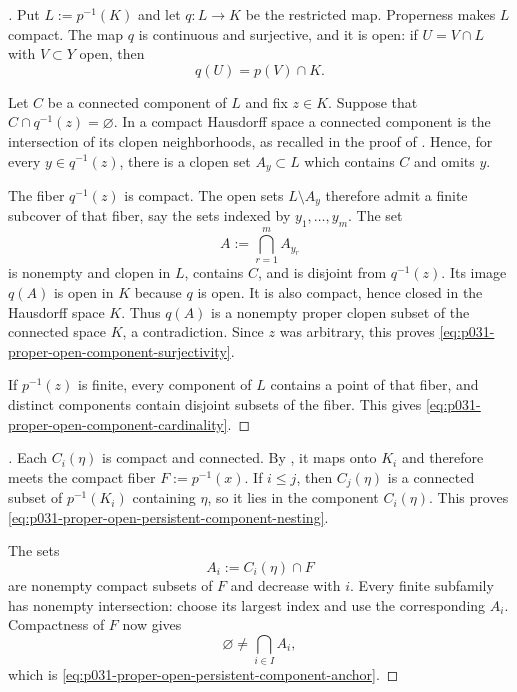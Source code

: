 
\begin{proof}[]
Put $L:=p^{-1}(K)$ and let $q:L\to K$ be the restricted map.  Properness
makes $L$ compact.  The map $q$ is continuous and surjective, and it is open:
if $U=V\cap L$ with $V\subset Y$ open, then
\[
                         q(U)=p(V)\cap K.
\]

Let $C$ be a connected component of $L$ and fix $z\in K$.  Suppose that
$C\cap q^{-1}(z)=\varnothing$.  In a compact Hausdorff space a connected
component is the intersection of its clopen neighborhoods, as recalled in
the proof of .  Hence, for every
$y\in q^{-1}(z)$, there is a clopen set $A_y\subset L$ which contains $C$
and omits $y$.

The fiber $q^{-1}(z)$ is compact.  The open sets $L\setminus A_y$ therefore
admit a finite subcover of that fiber, say the sets indexed by
$y_1,\ldots,y_m$.  The set
\[
                         A:=\bigcap_{r=1}^m A_{y_r}
\]
is nonempty and clopen in $L$, contains $C$, and is disjoint from
$q^{-1}(z)$.  Its image $q(A)$ is open in $K$ because $q$ is open.  It is
also compact, hence closed in the Hausdorff space $K$.  Thus $q(A)$ is a
nonempty proper clopen subset of the connected space $K$, a contradiction.
Since $z$ was arbitrary, this proves
\eqref{eq:p031-proper-open-component-surjectivity}.

If $p^{-1}(z)$ is finite, every component of $L$ contains a point of that
fiber, and distinct components contain disjoint subsets of the fiber.  This
gives \eqref{eq:p031-proper-open-component-cardinality}.
\end{proof}

\begin{proof}[]
Each $C_i(\eta)$ is compact and connected.  By
, it maps onto $K_i$ and
therefore meets the compact fiber $F:=p^{-1}(x)$.  If $i\leq j$, then
$C_j(\eta)$ is a connected subset of $p^{-1}(K_i)$ containing $\eta$, so
it lies in the component $C_i(\eta)$.  This proves
\eqref{eq:p031-proper-open-persistent-component-nesting}.

The sets
\[
                         A_i:=C_i(\eta)\cap F
\]
are nonempty compact subsets of $F$ and decrease with $i$.  Every finite
subfamily has nonempty intersection: choose its largest index and use the
corresponding $A_i$.  Compactness of $F$ now gives
\[
                   \varnothing\ne\bigcap_{i\in I}A_i,
\]
which is \eqref{eq:p031-proper-open-persistent-component-anchor}.
\end{proof}

